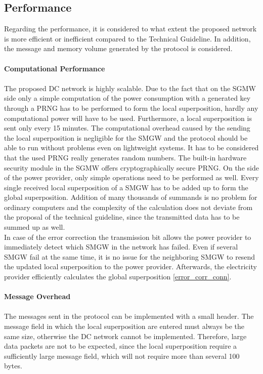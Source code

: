 \subsection{Performance}
Regarding the performance, it is considered to what extent the proposed network is more efficient or inefficient compared to the Technical Guideline. In addition, the message and memory volume generated by the protocol is considered.
\\
\\
\textbf{Computational Performance}
\\
\\
The proposed DC network is highly scalable. Due to the fact that on the SGMW side only a simple computation of the power consumption with a generated key through a PRNG has to be performed to form the local superposition, hardly any computational power will have to be used. Furthermore, a local superposition is sent only every 15 minutes. The computational overhead caused by the sending the local superposition is negligible for the SMGW and the protocol should be able to run without problems even on lightweight systems. It has to be considered that the used PRNG really generates random numbers. The built-in hardware security module in the SGMW offers cryptographically secure PRNG. On the side of the power provider, only simple operations need to be performed as well. Every single received local superposition of a SMGW has to be added up to form the global superposition. Addition of many thousands of summands is no problem for ordinary computers and the complexity of the calculation does not deviate from the proposal of the technical guideline, since the transmitted data has to be summed up as well.\\
In case of the error correction the transmission bit allows the power provider to immediately detect which SMGW in the network has failed. Even if several SMGW fail at the same time, it is no issue for the neighboring SMGW to resend the updated local superposition to the power provider. Afterwards, the electricity provider efficiently calculates the global superposition \ref{error_corr_conn}.\\
\\
\textbf{Message Overhead}
\\
\\
The messages sent in the protocol can be implemented with a small header. The message field in which the local superposition are entered must always be the same size, otherwise the DC network cannot be implemented. Therefore, large data packets are not to be expected, since the local superposition require a sufficiently large message field, which will not require more than several 100 bytes. \\
